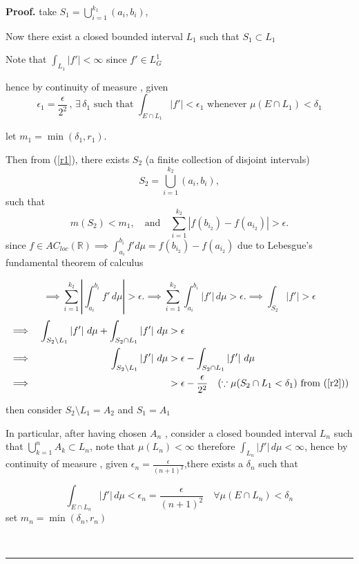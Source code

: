 \documentclass{article}
\numberwithin{equation}{section}
{\theoremstyle{break}\newtheorem{theorem}{Theorem}[subsection]}
{\theoremstyle{break}\theorembodyfont{\rmfamily}\newtheorem{example}[theorem]{Example}}
{\theoremstyle{break}\theorembodyfont{\rmfamily}\newtheorem{definition}[theorem]{Definition}}
{\theoremstyle{break}\theorembodyfont{\rmfamily}\newtheorem{notation}[theorem]{Notation}}
{\theoremstyle{break}\theorembodyfont{\rmfamily}\newtheorem{remark}[theorem]{Remark}}
\newenvironment{proof}[1][Proof]{\noindent\textbf{#1.} }{\
\rule{0.5em}{0.5em}}
\begin{document}
{{\begin{proof}
take $S_1 = \bigcup_{i=1}^{k_1} (a_i, b_i)$, 

Now there exist a closed bounded interval $L_1$
such that $S_1\subset L_1$

Note that $\int_{L_1} |f'| < \infty$ since $f' \in L^1_G$

hence by continuity of measure , given 
\begin{equation}\label{r2}
\epsilon_1 =\frac{\epsilon}{2^2}\,,\,
\exists\,\delta_1 \text{ such that }\int_{E\cap L_1} |f'| < \epsilon_1 
\text{ whenever }\mu(E\cap L_1 ) <\delta_1
\end{equation}

let $m_1 = \min(\delta_1, r_1)$.

Then from (\ref{r1}), there exists $S_2$ (a finite collection of disjoint intervals)
\[
S_2 = \bigcup_{i=1}^{k_2} (a_i, b_i),
\]
such that 
\[
m(S_2) < m_1, \quad \text{and} \quad \sum_{i=1}^{k_2} \left| f(b_{i_2}) - f(a_{i_2})\right| > \epsilon.
\]
since $ f\in AC_{loc}(\mathbb{R}) \implies\int_{a_i}^{b_i} f' d\mu =  f(b_{i_2}) - f(a_{i_2})$
due to Lebesgue's fundamental theorem of calculus 

\begin{equation}\label{r3}
    \implies \sum_{i=1}^{k_2} \left| \int_{a_i}^{b_i} f' \, d\mu \right| > \epsilon.
\implies  \sum_{i=1}^{k_2}  \int_{a_i}^{b_i} \left|f' \right|\, d\mu  > \epsilon.
\implies \int_{S_2} \left|f'\right| >\epsilon
\end{equation}    
\begin{align*}
\implies&&
\int_{S_2 \setminus L_1} \left|f'\right| \, d\mu + \int_{S_2 \cap L_1} \left|f'\right| \, d\mu & > \epsilon\\
\implies && 
\int_{S_2 \setminus L_1} \left|f'\right| \, d\mu &> \epsilon - \int_{S_2 \cap L_1} \left|f'\right| \, d\mu\\ 
\implies&&& >\epsilon-\frac{\epsilon}{2^2}\quad(\because \mu(S_2\cap L_1 <\delta_1 )  \text{ from }\text{(\ref{r2}))}
\end{align*}

then consider $S_2\setminus L_1 = A_2$ and $S_1 = A_1$

In particular, after having chosen $A_n$ , consider a closed bounded interval $L_n $ such that $ \bigcup _{k = 1}^n A_k \subset L_n$, note that $\mu(L_n) <\infty $ therefore $\int_{L_n} \left|f'\right| \, d\mu < \infty$, hence by continuity of  measure , given $\epsilon_n = \frac{\epsilon}{(n+1)^2}$,there exists a $\delta_n$ such that 

\begin{equation}\label{r4}
    \int_{E\cap L_n} \left|f'\right| \, d\mu < \epsilon_n = \frac{\epsilon}{(n+1)^2} \quad \forall \mu(E\cap L_n) <\delta_n
\end{equation}
set $m_n = \min (\delta_n,r_n) $


\end{proof}}}
\end{document}
